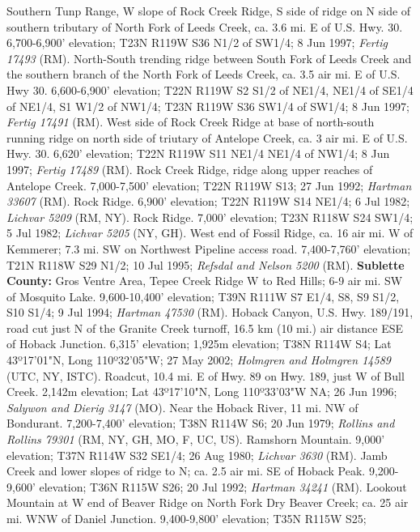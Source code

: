 Southern Tunp Range, W slope of Rock Creek Ridge, S side of ridge on N side of
southern tributary of North Fork of Leeds Creek, ca. 3.6 mi. E of U.S. Hwy. 30.
6,700-6,900' elevation; T23N R119W S36 N1/2 of SW1/4; 8 Jun 1997;
\textit{Fertig 17493} (RM).
North-South trending ridge between South Fork of Leeds Creek and the southern
branch of the North Fork of Leeds Creek, ca. 3.5 air mi. E of U.S. Hwy 30.
6,600-6,900' elevation; T22N R119W S2 S1/2 of NE1/4, NE1/4 of SE1/4 of NE1/4,
S1 W1/2 of NW1/4; T23N R119W S36 SW1/4 of SW1/4; 8 Jun 1997;
\textit{Fertig 17491} (RM).
West side of Rock Creek Ridge at base of north-south running ridge on north
side of triutary of Antelope Creek, ca. 3 air mi. E of U.S. Hwy. 30.
6,620' elevation; T22N R119W S11 NE1/4 NE1/4 of NW1/4; 8 Jun 1997;
\textit{Fertig 17489} (RM).
Rock Creek Ridge, ridge along upper reaches of Antelope Creek. 7,000-7,500'
elevation; T22N R119W S13; 27 Jun 1992; \textit{Hartman 33607} (RM).
Rock Ridge. 6,900' elevation; T22N R119W S14 NE1/4; 6 Jul 1982;
\textit{Lichvar 5209} (RM, NY).
Rock Ridge. 7,000' elevation; T23N R118W S24 SW1/4; 5 Jul 1982;
\textit{Lichvar 5205} (NY, GH).
West end of Fossil Ridge, ca. 16 air mi. W of Kemmerer; 7.3 mi. SW on Northwest
Pipeline access road. 7,400-7,760' elevation; T21N R118W S29 N1/2; 10 Jul 1995;
\textit{Refsdal and Nelson 5200} (RM).
  \textbf{Sublette County:}
Gros Ventre Area, Tepee Creek Ridge W to Red Hills; 6-9 air mi. SW of
Mosquito Lake. 9,600-10,400' elevation; T39N R111W S7 E1/4, S8, S9 S1/2,
S10 S1/4; 9 Jul 1994; \textit{Hartman 47530} (RM).
Hoback Canyon, U.S. Hwy. 189/191, road cut just N of the Granite Creek turnoff,
16.5 km (10 mi.) air distance ESE of Hoback Junction. 6,315' elevation;
1,925m elevation; T38N R114W S4; Lat 43º17'01"N, Long 110º32'05"W; 27 May 2002;
\textit{Holmgren and Holmgren 14589} (UTC, NY, ISTC).
Roadcut, 10.4 mi. E of Hwy. 89 on Hwy. 189, just W of Bull Creek.
2,142m elevation; Lat 43º17'10"N, Long 110º33'03"W NA; 26 Jun 1996;
\textit{Salywon and Dierig 3147} (MO).
Near the Hoback River, 11 mi. NW of Bondurant. 7,200-7,400' elevation;
T38N R114W S6; 20 Jun 1979;
\textit{Rollins and Rollins 79301} (RM, NY, GH, MO, F, UC, US).
Ramshorn Mountain. 9,000' elevation; T37N R114W S32 SE1/4; 26 Aug 1980;
\textit{Lichvar 3630} (RM).
Jamb Creek and lower slopes of ridge to N; ca. 2.5 air mi. SE of Hoback Peak.
9,200-9,600' elevation; T36N R115W S26; 20 Jul 1992;
\textit{Hartman 34241} (RM).
Lookout Mountain at W end of Beaver Ridge on North Fork Dry Beaver Creek; ca.
25 air mi. WNW of Daniel Junction. 9,400-9,800' elevation; T35N R115W S25;
